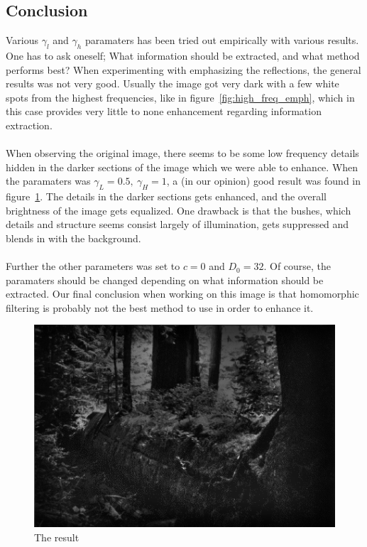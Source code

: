 		\subsection{Conclusion}
		Various $\gamma_l$ and $\gamma_h$ paramaters has been tried out empirically with 
		various results. One has to ask oneself; What information should be extracted, and what 
		method performs best? When experimenting with emphasizing the reflections, the 
		general results was not very good. Usually the image got very dark with a few white
		spots from the highest frequencies, like in figure~\ref{fig:high_freq_emph}, which
		in this case provides very little to none enhancement regarding information extraction.\\
		\\
		When observing the original image, there seems to be some 
		low frequency details hidden in the darker sections of the image which we were able
		to enhance. When the paramaters was $\gamma_L = 0.5,~\gamma_H = 1$, a (in our opinion)
		good result was 
		found in figure~\ref{fig:result}. The details in the darker sections gets enhanced, 
		and the overall brightness
		of the image gets equalized. One drawback is that the bushes, which details 
		and structure seems consist
		largely of illumination, gets suppressed and blends in with the background.\\
		\\
		Further the other parameters was set to $c = 0$ and $D_0 = 32$. Of course,
		the paramaters should be changed depending on what information should be extracted.
		Our final conclusion when working on this image is that homomorphic filtering
		is probably not the best method to use in order to enhance it.
		\begin{figure}[h!]
			\includegraphics[width=\textwidth]{pics/resulting_image.png}
			\caption{The result}
			\label{fig:result}		
		\end{figure}
							    
